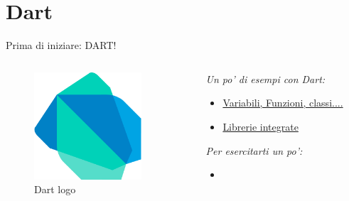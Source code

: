 \documentclass{../libs/presentation_format}
\begin{document}

\section{Dart}
\begin{frame}{Prima di iniziare: DART!}
	\begin{minipage}[0.2\textheight]{\textwidth}
		\begin{columns}[T]
			\begin{column}{0.4\textwidth}
				\begin{figure}[htpb]
					\centering
					\includegraphics[width=4cm]{../libs/dart-logo.png}
					\caption{Dart logo}
					\label{fig:Dart logo}
				\end{figure}
			\end{column}
			\begin{column}{0.6\textwidth}
				\emph{Un po' di esempi con Dart: }
				\newline
				\begin{itemize}
					\item \href{https://dart.dev/samples}{Variabili, Funzioni, classi....}
					\item \href{https://dart.dev/guides/libraries/library-tour}{Librerie integrate}
				\end{itemize}
				\emph{Per esercitarti un po': }
				\newline
				\begin{itemize}
					\item \href{https://dartpad.dev/?}{}
				\end{itemize}
			\end{column}
		\end{columns}
	\end{minipage}
\end{frame}

\end{document}
